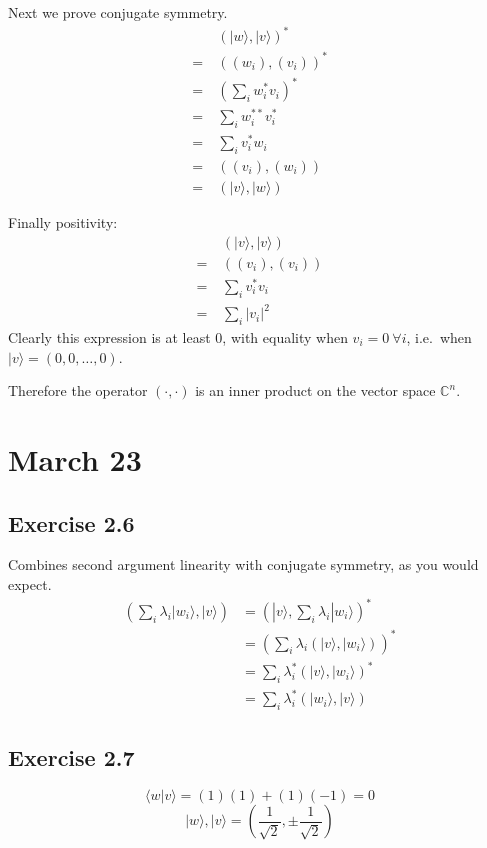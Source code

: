\documentclass[]{article}
\newcommand{\ket}[1]{| #1 \rangle}
\newcommand{\braket}[2]{\langle #1 | #2 \rangle}
\begin{document}
Next we prove conjugate symmetry.
\begin{align*}
	&{(\ket{w}, \ket{v})}^* \\
	=\ &{((w_i), (v_i))}^* \\
	=\ &{\left(\sum_i w_i^* v_i\right)}^* \\
	=\ &\sum_i w_i^{**}v_i^* \\
	=\ &\sum_i v_i^*w_i \\
	=\ &((v_i), (w_i)) \\
	=\ &(\ket{v}, \ket{w})
\end{align*}

Finally positivity:
\begin{align*}
	&(\ket{v}, \ket{v}) \\
=\ &((v_i), (v_i)) \\
=\ &\sum_i v_i^*v_i \\
=\ &\sum_i|v_i|^2
\end{align*}
Clearly this expression is at least 0, with equality when $v_i = 0\ \forall i$,
i.e.\ when $\ket{v} = (0, 0, \ldots, 0)$.

Therefore the operator $(\cdot, \cdot)$ is an inner product on the vector space $\mathbb{C}^n$.

\section{March 23}

\subsection{Exercise 2.6}

Combines second argument linearity with conjugate symmetry, as you would expect.
\begin{align*}
	\left(\sum_i\lambda_i\ket{w_i}, \ket{v}\right)
	&= {\left(\ket{v}, \sum_i\lambda_i\ket{w_i}\right)}^* \\
	&= {\left(\sum_i\lambda_i\left(\ket{v}, \ket{w_i}\right)\right)}^* \\
	&= \sum_i\lambda_i^*{\left(\ket{v}, \ket{w_i}\right)}^* \\
	&= \sum_i\lambda_i^*{\left(\ket{w_i}, \ket{v}\right)}
\end{align*}

\subsection{Exercise 2.7}

\[\braket{w}{v} = (1)(1)+(1)(-1) = 0\]
\[\ket{w}, \ket{v} = \left(\frac{1}{\sqrt{2}}, \pm\frac{1}{\sqrt{2}}\right)\]
\end{document}
